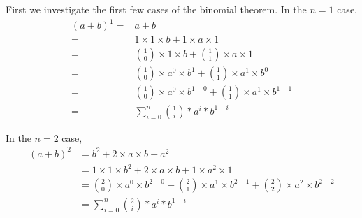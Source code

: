 \documentclass{proc-l}
\theoremstyle{definition}
\theoremstyle{remark}
\numberwithin{equation}{section}
\begin{document}
First we investigate the first few cases of the binomial theorem. In the \(n = 1\) case,
\begin{align*}
(a + b)^1 = & a + b \tag{base case of exp} \\ 
= & 1 \times 1 \times b + 1 \times a \times 1 \tag{1 as identity of product} \\
= & {1 \choose 0} \times 1 \times b + {1 \choose 1} \times a \times 1 \tag{base case of binomial, twice} \\
= & {1 \choose 0} \times a^0 \times b^1 + {1 \choose 1} \times a^1 \times b^0 \tag{base cases of exp, four times} \\
= & {1 \choose 0} \times a^0 \times b^{1-0} + {1 \choose 1} \times a^1 \times b^{1-1} \tag{properties of subtraction?} \\
= & \sum_{i=0}^n {1 \choose i} * a^i * b^{1-i} \tag{big-sigma introduction?}
\end{align*}

In the \(n = 2\) case,
\begin{align*}
(a + b)^2 & = b^2 + 2 \times a \times b + a^2 \\ %
& = 1 \times 1 \times b^2 + 2 \times a \times b + 1 \times a^2 \times 1 \\
& = {2 \choose 0} \times a^0 \times b^{2-0} + {2 \choose 1} \times a^1 \times b^{2-1} + {2 \choose 2} \times a^2 \times b^{2-2} \\
& = \sum_{i=0}^n {2 \choose i} * a^i * b^{1-i} %
\end{align*}
\end{document}
